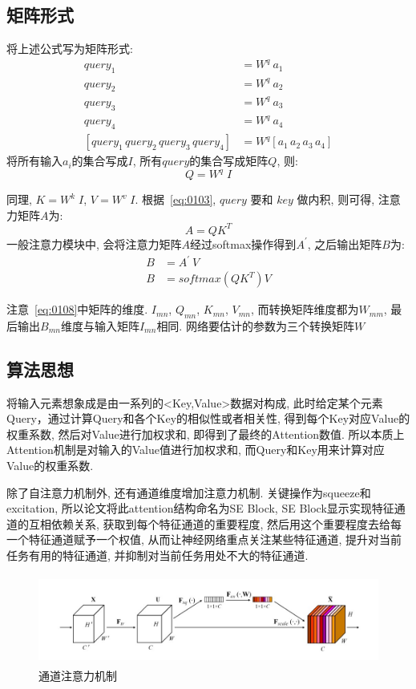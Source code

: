 \subsection{矩阵形式}
将上述公式写为矩阵形式:
\begin{align*}
    query_{1} &= W^{q}\ a_{1}\\
    query_{2} &= W^{q}\ a_{2}\\
    query_{3} &= W^{q}\ a_{3}\\
    query_{4} &= W^{q}\ a_{4}\\
    [query_{1}\, query_{2}\, query_{3}\, query_{4}] & = W^{q} [a_{1}\, a_{2}\, a_{3}\, a_{4}]
\end{align*}
将所有输入$a_{i}$的集合写成$I$, 所有$query$的集合写成矩阵$Q$, 则:
\begin{equation}
    Q = W^{q}\; I
    \label{eq:0106}
\end{equation}

同理, $K=W^{k}\; I$, $V=W^{v}\; I$. 根据~\ref{eq:0103}, $query$ 要和 $key$ 做内积, 则可得, 注意力矩阵$A$为:
\begin{equation}
    A = QK^{T}
    \label{eq:0107}
\end{equation}
一般注意力模块中, 会将注意力矩阵$A$经过softmax操作得到$A^{\prime}$, 之后输出矩阵$B$为:
\begin{align}
    B &= A^{\prime}\ V\\
    B &= softmax(QK^{T})V
    \label{eq:0108}
\end{align}

注意~\ref{eq:0108}中矩阵的维度. $I_{mn}$, $Q_{mn}$, $K_{mn}$, $V_{mn}$, 而转换矩阵维度都为$W_{mm}$, 最后输出$B_{mn}$维度与输入矩阵$I_{mn}$相同. 网络要估计的参数为三个转换矩阵$W$

\subsection{算法思想}
将输入元素想象成是由一系列的<Key,Value>数据对构成, 此时给定某个元素Query，通过计算Query和各个Key的相似性或者相关性, 得到每个Key对应Value的权重系数, 然后对Value进行加权求和, 即得到了最终的Attention数值. 所以本质上Attention机制是对输入的Value值进行加权求和, 而Query和Key用来计算对应Value的权重系数. 

除了自注意力机制外, 还有通道维度增加注意力机制. 关键操作为squeeze和excitation, 所以论文将此attention结构命名为SE Block, SE Block显示实现特征通道的互相依赖关系, 获取到每个特征通道的重要程度, 然后用这个重要程度去给每一个特征通道赋予一个权值, 从而让神经网络重点关注某些特征通道, 提升对当前任务有用的特征通道, 并抑制对当前任务用处不大的特征通道. 
\begin{figure}[!htbp]
    \centering
    \includegraphics[height=8em]{pic/pic0102.jpg}
    \caption{通道注意力机制}
    \label{fig:0102}
\end{figure}

